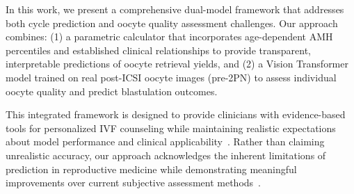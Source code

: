 In this work, we present a comprehensive dual-model framework that addresses both cycle prediction and oocyte quality assessment challenges. Our approach combines: (1) a parametric calculator that incorporates age-dependent AMH percentiles and established clinical relationships to provide transparent, interpretable predictions of oocyte retrieval yields, and (2) a Vision Transformer model trained on real post-ICSI oocyte images (pre-2PN) to assess individual oocyte quality and predict blastulation outcomes.

This integrated framework is designed to provide clinicians with evidence-based tools for personalized IVF counseling while maintaining realistic expectations about model performance and clinical applicability~\cite{asrm2021counselors}. Rather than claiming unrealistic accuracy, our approach acknowledges the inherent limitations of prediction in reproductive medicine while demonstrating meaningful improvements over current subjective assessment methods~\cite{varoquaux2022machine}. 